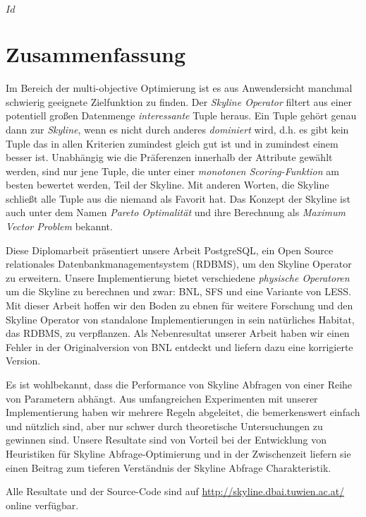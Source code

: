 
\svnInfo $Id$


\chapter*{Zusammenfassung\revision}


Im Bereich der multi-objective Optimierung ist es aus Anwendersicht
manchmal schwierig geeignete Zielfunktion zu finden.
%
Der \emph{Skyline Operator} filtert aus einer potentiell gro\ss{}en
Datenmenge \emph{interessante} Tuple heraus.
%
Ein Tuple geh\"ort genau dann zur \emph{Skyline}, wenn es nicht durch
anderes \emph{dominiert} wird, d.h. es gibt kein Tuple das in allen
Kriterien zumindest gleich gut ist und in zumindest einem besser ist.
%
Unabh\"angig wie die Pr\"aferenzen innerhalb der Attribute gew\"ahlt
werden, sind nur jene Tuple, die unter einer \emph{monotonen
Scoring-Funktion} am besten bewertet werden, Teil der Skyline.
%
Mit anderen Worten, die Skyline schlie\ss{}t alle Tuple aus die
niemand als Favorit hat.
%
Das Konzept der Skyline ist auch unter dem Namen \emph{Pareto
Optimalit\"at} und ihre Berechnung als \emph{Maximum Vector
Problem} bekannt.


Diese Diplomarbeit pr\"asentiert unsere Arbeit PostgreSQL, ein Open
Source relationales Datenbankmanagementsystem (RDBMS), um den Skyline Operator zu
erweitern.
%
Unsere Implementierung bietet verschiedene \emph{physische Operatoren}
um die Skyline zu berechnen und zwar: BNL, SFS und eine Variante von
LESS.
%
Mit dieser Arbeit hoffen wir den Boden zu ebnen f\"ur weitere
Forschung und den Skyline Operator von standalone Implementierungen in
sein nat\"urliches Habitat, das RDBMS, zu verpflanzen.
%
Als Nebenresultat unserer Arbeit haben wir einen Fehler in der Originalversion von BNL
entdeckt und liefern dazu eine korrigierte Version.


Es ist wohlbekannt, dass die Performance von Skyline Abfragen von einer
Reihe von Parametern abh\"angt.
%
Aus umfangreichen Experimenten mit unserer Implementierung haben wir
mehrere Regeln abgeleitet, die bemerkenswert einfach und n\"utzlich
sind, aber nur schwer durch theoretische Untersuchungen zu gewinnen
sind.
%
Unsere Resultate sind von Vorteil bei der Entwicklung von Heuristiken
f\"ur Skyline Abfrage-Optimierung und in der Zwischenzeit liefern sie
einen Beitrag zum tieferen Verst\"andnis der Skyline Abfrage
Charakteristik.


Alle Resultate und der Source-Code sind auf
\url{http://skyline.dbai.tuwien.ac.at/} online verf\"ugbar.
